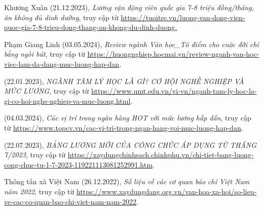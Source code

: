 \begin{thebibliography}{99}
    Khương Xuân (21.12.2023),
    \emph{Lương vận động viên quốc gia 7-8 triệu đồng/tháng, ăn không đủ dinh dưỡng},
    truy cập từ \href{https://tuoitre.vn/luong-van-dong-vien-quoc-gia-7-8-trieu-dong-thang-an-khong-du-dinh-duong-20231221114836483.htm#:~:text=Theo%20ngh%E1%BB%8B%20%C4%91%E1%BB%8Bnh%20152%20quy,tri%E1%BB%87u%20%C4%91%E1%BB%93ng%2Fng%C6%B0%E1%BB%9Di%2Fth%C3%A1ng.}{\color{black}https://tuoitre.vn/luong-van-dong-vien-quoc-gia-7-8-trieu-dong-thang-an-khong-du-dinh-duong.}

    Phạm Giang Linh (03.05.2024),
    \emph{Review ngành Văn học\_Tô điểm cho cuộc đời chỉ bằng ngòi bút},
    truy cập từ \href{https://huongnghiep.hocmai.vn/review-nganh-van-hoc-viec-lam-da-dang-muc-luong-hap-dan/#:~:text=Hi%E1%BB%87n%20nay%20m%E1%BB%A9c%20l%C6%B0%C6%A1ng%20c%E1%BB%A7a,ph%C3%A1t%20tri%E1%BB%83n%20chuy%C3%AAn%20s%C3%A2u%20h%C6%A1n}{\color{black}https://huongnghiep.hocmai.vn/review-nganh-van-hoc-viec-lam-da-dang-muc-luong-hap-dan}.
    
    (22.01.2023), 
    \emph{NGÀNH TÂM LÝ HỌC LÀ GÌ? CƠ HỘI NGHỀ NGHIỆP VÀ MỨC LƯƠNG},
    truy cập từ \href{https://www.umt.edu.vn/vi-vn/nganh-tam-ly-hoc-la-gi-co-hoi-nghe-nghiep-va-muc-luong.html}{\color{black}https://www.umt.edu.vn/vi-vn/nganh-tam-ly-hoc-la-gi-co-hoi-nghe-nghiep-va-muc-luong.html}.

    (04.03.2024),
    \emph{Các vị trí trong ngân hàng HOT với mức lương hấp dẫn},
    truy cập từ \href{https://www.topcv.vn/cac-vi-tri-trong-ngan-hang-voi-muc-luong-hap-dan#:~:text=Giao%20d%E1%BB%8Bch%20vi%C3%AAn%20ng%C3%A2n%20h%C3%A0ng%20c%C3%B3%20m%E1%BB%A9c%20l%C6%B0%C6%A1ng%20trung%20b%C3%ACnh,nh%E1%BA%ADt%20m%E1%BB%9Bi%20nh%E1%BA%A5t%20t%E1%BA%A1i%20TopCV! }{\color{black}https://www.topcv.vn/cac-vi-tri-trong-ngan-hang-voi-muc-luong-hap-dan}.

    (22.07.2023),
    \emph{BẢNG LƯƠNG MỚI CỦA CÔNG CHỨC ÁP DỤNG TỪ THÁNG 7/2023},
    truy cập từ \href{https://xaydungchinhsach.chinhphu.vn/chi-tiet-bang-luong-cong-chuc-tu-1-7-2023-119221113081252991.htm}{\color{black}https://xaydungchinhsach.chinhphu.vn/chi-tiet-bang-luong-cong-chuc-tu-1-7-2023-119221113081252991.htm}.

    Thông tấn xã Việt Nam (26.12.2022),
    \emph{Số liệu về các cơ quan báo chí Việt Nam năm 2022},
    truy cập từ \href{https://www.xaydungdang.org.vn/van-hoa-xa-hoi/so-lieu-ve-cac-co-quan-bao-chi-viet-nam-nam-2022-18260#:~:text=thanh%2C%20truy%E1%BB%81n%20h%C3%ACnh.-,N%C4%83m%202022%2C%20c%E1%BA%A3%20n%C6%B0%E1%BB%9Bc%20c%C3%B3%20127%20c%C6%A1%20quan%20b%C3%A1o%3B%20670,h%C3%ACnh%20x%E1%BA%A5p%20x%E1%BB%89%2016.500%20ng%C6%B0%E1%BB%9Di}{\color{black}https://www.xaydungdang.org.vn/van-hoa-xa-hoi/so-lieu-ve-cac-co-quan-bao-chi-viet-nam-nam-2022}.
    

\end{thebibliography}
